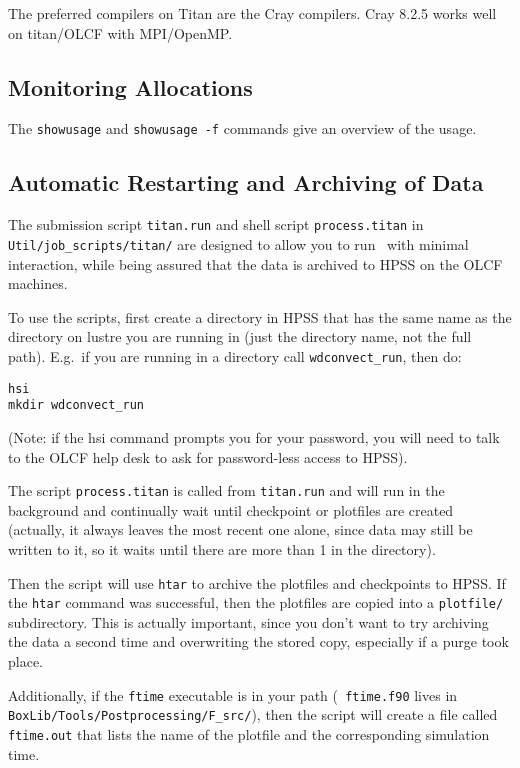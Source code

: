 The preferred compilers on Titan are the Cray compilers.  
Cray 8.2.5 works well on titan/OLCF with MPI/OpenMP.


\subsection{Monitoring Allocations}

The {\tt showusage} and {\tt showusage -f} commands give an
overview of the usage.

\subsection{Automatic Restarting and Archiving of Data}

The submission script {\tt titan.run} and shell script
{\tt process.titan} in {\tt Util/job\_scripts/titan/}
are designed to allow you to run \maestro\ with minimal interaction,
while being assured that the data is archived to HPSS on the OLCF
machines.

To use the scripts, first create a directory in HPSS that has the same
name as the directory on lustre you are running in (just the directory
name, not the full path).  E.g.\ if you are running in a directory
call {\tt wdconvect\_run}, then do:
\begin{verbatim}
hsi
mkdir wdconvect_run
\end{verbatim}
(Note: if the hsi command prompts you for your password, you will need
to talk to the OLCF help desk to ask for password-less access to
HPSS).

The script {\tt process.titan} is called from {\tt titan.run} and will
run in the background and continually wait until checkpoint or
plotfiles are created (actually, it always leaves the most recent one
alone, since data may still be written to it, so it waits until there
are more than 1 in the directory).

Then the script will use {\tt htar} to archive the plotfiles and
checkpoints to HPSS.  If the {\tt htar} command was successful, then
the plotfiles are copied into a {\tt plotfile/} subdirectory.  This is
actually important, since you don't want to try archiving the data a
second time and overwriting the stored copy, especially if a purge
took place.

Additionally, if the {\tt ftime} executable is in your path ({\tt
ftime.f90} lives in {\tt BoxLib/Tools/Postprocessing/F\_src/}), then
the script will create a file called {\tt ftime.out} that lists the
name of the plotfile and the corresponding simulation time.

